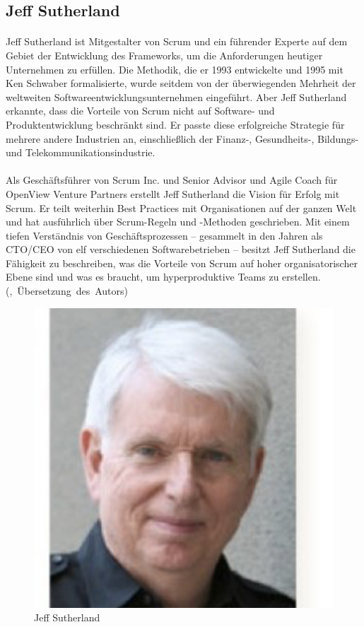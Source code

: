 \documentclass{article}
\begin{document}
\subsection{Jeff Sutherland}
\paragraph{}
Jeff Sutherland ist Mitgestalter von Scrum und ein führender Experte auf dem Gebiet der Entwicklung des Frameworks, um die Anforderungen heutiger Unternehmen zu erfüllen. Die Methodik, die er 1993 entwickelte und 1995 mit Ken Schwaber formalisierte, wurde seitdem von der überwiegenden Mehrheit der weltweiten Softwareentwicklungsunternehmen eingeführt. Aber Jeff Sutherland erkannte, dass die Vorteile von Scrum nicht auf Software- und Produktentwicklung beschränkt sind. Er passte diese erfolgreiche Strategie für mehrere andere Industrien an, einschließlich der Finanz-, Gesundheits-, Bildungs- und Telekommunikationsindustrie.

\paragraph{}
Als Geschäftsführer von Scrum Inc. und Senior Advisor und Agile Coach für OpenView Venture Partners erstellt Jeff Sutherland die Vision für Erfolg mit Scrum. Er teilt weiterhin Best Practices mit Organisationen auf der ganzen Welt und hat ausführlich über Scrum-Regeln und -Methoden geschrieben. Mit einem tiefen Verständnis von Geschäftsprozessen – gesammelt in den Jahren als CTO/CEO von elf verschiedenen Softwarebetrieben – besitzt Jeff Sutherland die Fähigkeit zu beschreiben, was die Vorteile von Scrum auf hoher organisatorischer Ebene sind und was es braucht, um hyperproduktive Teams zu erstellen. (\cite{jeff},~Übersetzung~des~Autors)

\begin{figure}[h]
  \centering
  \includegraphics[scale=.5]{img/jeff.png}
  \caption{Jeff Sutherland}
  \label{jeffpng}
\end{figure}
\end{document}
